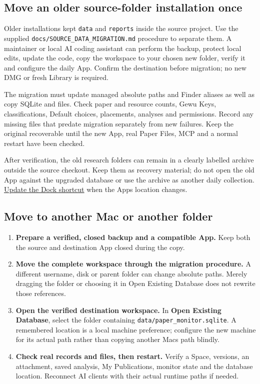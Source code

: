 \documentclass[10pt,letterpaper,oneside]{scrreprt}
\providecommand{\tightlist}{\setlength{\itemsep}{1pt}\setlength{\parskip}{0pt}}
\begin{document}
\subsection{Move an older source-folder installation once}\label{source-workspace-migration}

Older installations kept \texttt{data} and \texttt{reports} inside the source project. Use the supplied \texttt{docs/SOURCE\_DATA\_MIGRATION.md} procedure to separate them. A maintainer or local AI coding assistant can perform the backup, protect local edits, update the code, copy the workspace to your chosen new folder, verify it and configure the daily App. Confirm the destination before migration; no new DMG or fresh Library is required.

The migration must update managed absolute paths and Finder aliases as well as copy SQLite and files. Check paper and resource counts, Gewu Keys, classifications, Default choices, placements, analyses and permissions. Record any missing files that predate migration separately from new failures. Keep the original recoverable until the new App, real Paper Files, MCP and a normal restart have been checked.

After verification, the old research folders can remain in a clearly labelled archive outside the source checkout. Keep them as recovery material; do not open the old App against the upgraded database or use the archive as another daily collection. \hyperref[dock-entry]{Update the Dock shortcut} when the App\textquotesingle s location changes.

\subsection{Move to another Mac or another folder}\label{move-to-another-mac-or-another-folder}

\begin{enumerate}
\tightlist
\item
  \textbf{Prepare a verified, closed backup and a compatible App.} Keep both the source and destination App closed during the copy.
\item
  \textbf{Move the complete workspace through the migration procedure.} A different username, disk or parent folder can change absolute paths. Merely dragging the folder or choosing it in Open Existing Database does not rewrite those references.
\item
  \textbf{Open the verified destination workspace.} In \textbf{Open Existing Database}, select the folder containing \nolinkurl{data/paper_monitor.sqlite}. A remembered location is a local machine preference; configure the new machine for its actual path rather than copying another Mac\textquotesingle s path blindly.
\item
  \textbf{Check real records and files, then restart.} Verify a Space, versions, an attachment, saved analysis, My Publications, monitor state and the database location. Reconnect AI clients with their actual runtime paths if needed.
\end{enumerate}
\end{document}
